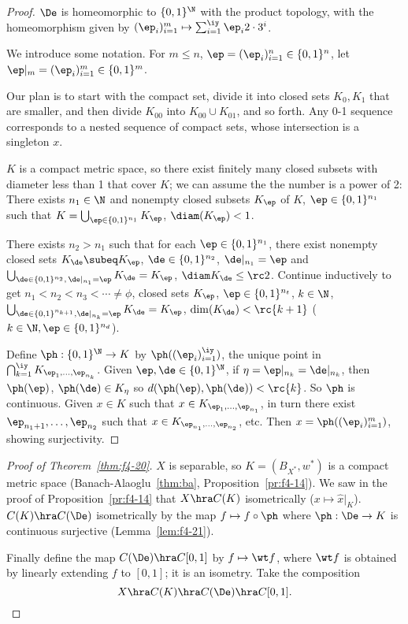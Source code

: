\begin{proof}
$\De$ is homeomorphic to $\{0,1\}^{\N}$ with the product topology, with the homeomorphism given by $(\ep_i)_{i=1}^m \mapsto \sum_{i=1}^{\iy} \ep_i 2\cdot 3^{i}$. %

We introduce some notation. For $m\le n$, $\ep=(\ep_i)_{i=1}^n\in \{0,1\}^n$, let $\ep|_{m}=(\ep_i)_{i=1}^m\in \{0,1\}^m$.

Our plan is to start with the compact set, %
divide it into closed sets $K_0,K_1$ that are smaller, and then divide $K_{00}$ into $K_{00}\cup K_{01}$, and so forth. Any 0-1 sequence corresponds to a nested sequence of compact sets, whose intersection is a singleton $x$.

$K$ is a compact metric space, so there exist finitely many closed subsets with diameter less than 1 that cover $K$; we can assume the the number is a power of 2: There exists $n_1\in \N$ and nonempty closed subsets $K_{\ep}$ of $K$, $\ep\in \{0,1\}^{n_1}$ such that $K=\bigcup_{\ep\in \{0,1\}^{n_1}}K_{\ep}$, $\diam(K_{\ep})<1$.

There exists $n_2>n_1$ such that for each $\ep\in \{0,1\}^{n_1}$, there exist nonempty closed sets $K_{\de}\subeq K_{\ep}$, $\de\in \{0,1\}^{n_2}$, $\de|_{n_1}=\ep$ and $\bigcup_{\de\in \{0,1\}^{n_2},\, \de|_{n_1}=\ep} K_{\de}=K_{\ep}$, $\diam K_{\de}\le \rc 2$. Continue inductively to get $n_1<n_2<n_3<\cdots \ne \phi$, closed sets $K_{\ep}$, $\ep\in \{0,1\}^{n_t}$, $k\in \N$, $\bigcup_{\de\in \{0,1\}^{n_{k+1}},\de|_{n_k}=\ep} K_{\de}=K_{\ep}$, $\dim(K_{\de})<\rc{k+1}$ ($k\in \N, \ep\in \{0,1\}^{n_d}$). 

Define $\ph:\{0,1\}^{\N}\to K$ by $\ph((\ep_i)_{i=1}^{\iy})$, the unique point in $\bigcap_{k=1}^{\iy} K_{\ep_1,\ldots ,\ep_{n_k}}$. Given $\ep,\de\in \{0,1\}^{\N}$, if $\eta=\ep|_{n_k}=\de|_{n_k}$, then $\ph(\ep)$, $\ph(\de)\in K_{\eta}$ so $d(\ph(\ep),\ph(\de))<\rc{k}$. So $\ph$ is continuous.
Given $x\in K$ such that $x\in K_{\ep_1,\ldots, \ep_{n_1}}$, in turn there exist $\ep_{n_1+1},\ldots, \ep_{n_2}$ such that $x\in K_{\ep_{n_1},\ldots, \ep_{n_2}}$, etc. Then $x=\ph((\ep_i)_{i=1}^m)$, showing surjectivity.
\end{proof}

\begin{proof}[Proof of Theorem~\ref{thm:f4-20}]
$X$ is separable, so $K=(B_{X^*},w^*)$ is a compact metric space (Banach-Alaoglu~\ref{thm:ba}, Proposition~\ref{pr:f4-14}). We saw in the proof of Proposition~\ref{pr:f4-14} that $X\hra C(K)$ isometrically ($x\mapsto \hat x|_K$). $C(K)\hra C(\De)$ isometrically by the map $f\mapsto f\circ \ph$ where $\ph:\De\to K$ is continuous surjective (Lemma~\ref{lem:f4-21}).

Finally define the map $C(\De)\hra C[0,1]$ by $f\mapsto \wt f$, where $\wt f$ is obtained by linearly extending $f$ to $[0,1]$; it is an isometry. Take the composition \[X\hra C(K)\hra C(\De)\hra C[0,1].\] 
\end{proof}

